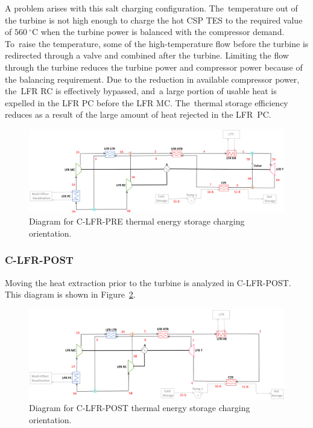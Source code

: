 \documentclass[sustainability,article,accept,moreauthors,pdftex]{Definitions/mdpi}
\begin{document}
\begin{paracol}{2}
A problem arises with this salt charging configuration. The~temperature out of the turbine is not high enough to charge the hot CSP TES to the required value of $560~^{\circ}$C when the turbine power is balanced with the compressor demand. To~raise the temperature, some of the high-temperature flow before the turbine is redirected through a valve and combined after the turbine. Limiting the flow through the turbine reduces the turbine power and compressor power because of the balancing requirement. Due to the reduction in available compressor power, the~LFR RC is effectively bypassed, and~a large portion of usable heat is expelled in the LFR PC before the LFR MC. The~thermal storage efficiency reduces as a result of the large amount of heat rejected in the LFR~PC.

\end{paracol}
\begin{figure}[H]
    \widefigure
    \includegraphics[width=\linewidth]{Definitions/c-lfr-pre.pdf}
    \caption{Diagram for C-LFR-PRE thermal energy storage charging orientation\label{c-lfr-pre}.}
\end{figure}
\begin{paracol}{2}
\switchcolumn




\subsubsection{C-LFR-POST} 

Moving the heat extraction prior to the turbine is analyzed in C-LFR-POST. This diagram is shown in Figure~\ref{c-lfr-post}.

\end{paracol}
\begin{figure}[H]
    \widefigure
    \includegraphics[width=\linewidth]{Definitions/c-lfr-post.pdf}
    \caption{Diagram for C-LFR-POST thermal energy storage charging orientation\label{c-lfr-post}.}
\end{figure}
\end{document}
